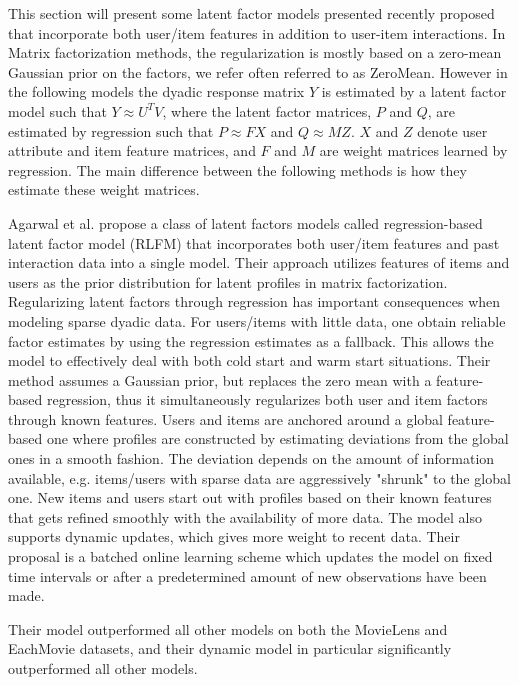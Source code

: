 This section will present some latent factor models presented recently proposed
that incorporate both user/item features in addition to user-item interactions.
In Matrix factorization methods, the regularization is mostly based on a
zero-mean Gaussian prior on the factors, we refer often referred to as
ZeroMean. However in the following models the dyadic response matrix $Y$ is
estimated by a latent factor model such that $Y \approx U^{T}V$, where the
latent factor matrices, $P$ and $Q$, are estimated by regression such that $P
\approx FX$ and $Q \approx MZ$. $X$ and $Z$ denote user attribute and item
feature matrices, and $F$ and $M$ are weight matrices learned by regression.
The main difference between the following methods is how they estimate these
weight matrices.


Agarwal et al. \cite{Agarwal2009} propose a class of latent factors models
called regression-based latent factor model (RLFM) that incorporates both
user/item features and past interaction data into a single model. Their
approach utilizes features of items and users as the prior distribution for
latent profiles in matrix factorization. Regularizing latent factors through
regression has important consequences when modeling sparse dyadic data. For
users/items with little data, one obtain reliable factor estimates by using the
regression estimates as a fallback. This allows the model to effectively deal
with both cold start and warm start situations. Their method assumes a Gaussian
prior, but replaces the zero mean with a feature-based regression, thus it
simultaneously regularizes both user and item factors through known features.
Users and items are anchored around a global feature-based one where profiles
are constructed by estimating deviations from the global ones in a smooth
fashion. The deviation depends on the amount of information available, e.g.
items/users with sparse data are aggressively "shrunk" to the global one. New
items and users start out with profiles based on their known features that gets
refined smoothly with the availability of more data. The model also supports
dynamic updates, which gives more weight to recent data. Their proposal is a
batched online learning scheme which updates the model on fixed time intervals
or after a predetermined amount of new observations have been made.

Their model outperformed all other models on both the MovieLens and EachMovie
datasets, and their dynamic model in particular significantly outperformed all
other models.

